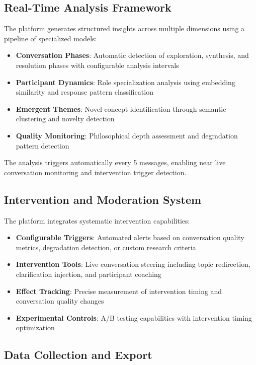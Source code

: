 \documentclass[11pt,letterpaper]{article}
\begin{document}
\subsection{Real-Time Analysis Framework}

The platform generates structured insights across multiple dimensions using a pipeline of specialized models:

\begin{itemize}
    \item \textbf{Conversation Phases}: Automatic detection of exploration, synthesis, and resolution phases with configurable analysis intervals
    \item \textbf{Participant Dynamics}: Role specialization analysis using embedding similarity and response pattern classification
    \item \textbf{Emergent Themes}: Novel concept identification through semantic clustering and novelty detection
    \item \textbf{Quality Monitoring}: Philosophical depth assessment and degradation pattern detection
\end{itemize}

The analysis triggers automatically every 5 messages, enabling near live conversation monitoring and intervention trigger detection.

\subsection{Intervention and Moderation System}

The platform integrates systematic intervention capabilities:

\begin{itemize}
    \item \textbf{Configurable Triggers}: Automated alerts based on conversation quality metrics, degradation detection, or custom research criteria
    \item \textbf{Intervention Tools}: Live conversation steering including topic redirection, clarification injection, and participant coaching
    \item \textbf{Effect Tracking}: Precise measurement of intervention timing and conversation quality changes
    \item \textbf{Experimental Controls}: A/B testing capabilities with intervention timing optimization
\end{itemize}

\subsection{Data Collection and Export}
\end{document}
